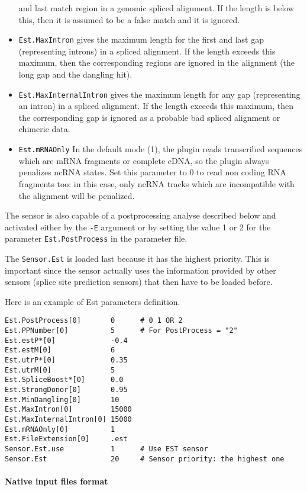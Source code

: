 \begin{itemize}
  and last match region in a genomic spliced alignment. If the length
  is below this, then it is assumed to be a false match and it is
  ignored.
\item \texttt{Est.MaxIntron} gives the maximum length for the first
  and last gap (representing introns) in a spliced alignment. If the
  length exceeds this maximum, then the corresponding regions are
  ignored in the alignment (the long gap and the dangling hit).
\item \texttt{Est.MaxInternalIntron} gives the maximum length for any
  gap (representing an intron) in a spliced alignment. If the length
  exceeds this maximum, then the corresponding gap is ignored as
  a probable bad spliced alignment or chimeric data.
\item \texttt{Est.mRNAOnly} In the default mode (1), the plugin reads 
transcribed sequences which are mRNA fragments or complete cDNA, 
so the plugin always penalizes ncRNA states. Set this parameter to 0 
to read non coding RNA fragments too: in this case, only ncRNA tracks 
which are incompatible with the alignment will be penalized.

\end{itemize}

The sensor is also capable of a postprocessing analyse described below
and activated either by the \texttt{-E} argument or by setting the value
1 or 2 for the parameter \texttt{Est.PostProcess} in the parameter
file.

The \texttt{Sensor.Est} is loaded last because it has the highest priority.
This is important since the sensor actually uses the information
provided by other sensors (splice site prediction sensors) that then have to be loaded before.

Here is an example of Est parameters definition.
\begin{Verbatim}[fontsize=\small]
Est.PostProcess[0]       0      # 0 1 OR 2
Est.PPNumber[0]          5      # For PostProcess = "2"
Est.estP*[0]             -0.4
Est.estM[0]              6
Est.utrP*[0]             0.35
Est.utrM[0]              5
Est.SpliceBoost*[0]      0.0
Est.StrongDonor[0]       0.95
Est.MinDangling[0]       10
Est.MaxIntron[0]         15000
Est.MaxInternalIntron[0] 15000
Est.mRNAOnly[0]          1
Est.FileExtension[0]     .est
Sensor.Est.use           1      # Use EST sensor
Sensor.Est               20     # Sensor priority: the highest one

\end{Verbatim}


\paragraph{Native input files format}

